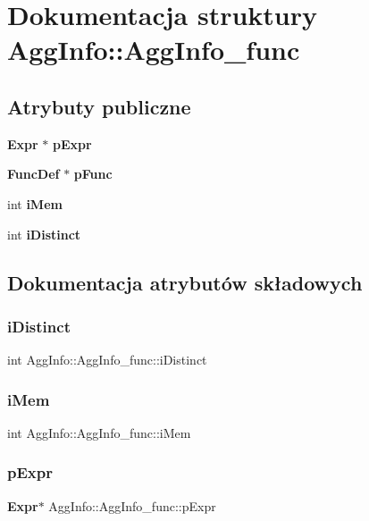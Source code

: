 \section{Dokumentacja struktury Agg\+Info\+::Agg\+Info\+\_\+func}
\label{struct_agg_info_1_1_agg_info__func}
\subsection*{Atrybuty publiczne}
\begin{DoxyCompactItemize}
\item 
\textbf{ Expr} $\ast$ \textbf{ p\+Expr}
\item 
\textbf{ Func\+Def} $\ast$ \textbf{ p\+Func}
\item 
int \textbf{ i\+Mem}
\item 
int \textbf{ i\+Distinct}
\end{DoxyCompactItemize}


\subsection{Dokumentacja atrybutów składowych}
\mbox{\label{struct_agg_info_1_1_agg_info__func_a4a82635b0116eb44ec8ca9e47cc509d9}} 
\subsubsection{iDistinct}
{\footnotesize\ttfamily int Agg\+Info\+::\+Agg\+Info\+\_\+func\+::i\+Distinct}

\mbox{\label{struct_agg_info_1_1_agg_info__func_a41a8da36555c37fffc65f1acead49a4f}} 
\subsubsection{iMem}
{\footnotesize\ttfamily int Agg\+Info\+::\+Agg\+Info\+\_\+func\+::i\+Mem}

\mbox{\label{struct_agg_info_1_1_agg_info__func_a7b92e1c42e60d44e28ebf695316f4018}} 
\subsubsection{pExpr}
{\footnotesize\ttfamily \textbf{ Expr}$\ast$ Agg\+Info\+::\+Agg\+Info\+\_\+func\+::p\+Expr}

